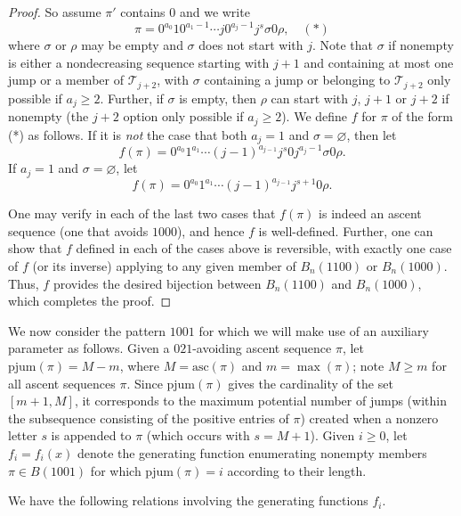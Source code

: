 \documentclass{article}
\theoremstyle{remark}
\theoremstyle{plain}
\begin{document}
\begin{proof}
So assume $\pi'$ contains 0 and we write $$\pi=0^{a_0}10^{a_1-1}\cdots j0^{a_j-1}j^s\sigma0\rho, \quad(*)$$ where $\sigma$ or $\rho$ may be empty and $\sigma$ does not start with $j$.  Note that $\sigma$ if nonempty is either a nondecreasing sequence starting with $j+1$ and containing at most one jump or a member of $\mathcal{T}_{j+2}$,  with $\sigma$ containing a jump or belonging to $\mathcal{T}_{j+2}$ only possible if $a_j\geq 2$.  Further, if $\sigma$ is empty, then $\rho$ can start with $j$, $j+1$ or $j+2$ if nonempty (the $j+2$ option only possible if $a_j \geq 2$).  We define $f$ for $\pi$ of the form (*) as follows.  If it is \emph{not} the case that both $a_j=1$ and $\sigma=\varnothing$,
then let
$$f(\pi)=0^{a_0}1^{a_1}\cdots(j-1)^{a_{j-1}}j^s0j^{a_j-1}\sigma0\rho.$$
If $a_j=1$ and $\sigma=\varnothing$, let
$$f(\pi)=0^{a_0}1^{a_1}\cdots(j-1)^{a_{j-1}}j^{s+1}0\rho.$$

One may verify in each of the last two cases that $f(\pi)$ is indeed an ascent sequence (one that avoids $1000$), and hence $f$ is well-defined.  Further, one can show that $f$ defined in each of the cases above is reversible, with exactly one case of $f$ (or its inverse) applying to any given member of $B_n(1100)$ or $B_n(1000)$.  Thus, $f$ provides the desired bijection between $B_n(1100)$ and $B_n(1000)$, which completes the proof.
\end{proof}

We now consider the pattern $1001$ for which we will make use of an auxiliary parameter as follows.  Given a $021$-avoiding ascent sequence $\pi$, let $\text{pjum}(\pi)=M-m$, where $M=\text{asc}(\pi)$ and $m=\max(\pi)$; note $M \geq m$ for all ascent sequences $\pi$.  Since $\text{pjum}(\pi)$ gives the cardinality of the set $[m+1,M]$, it corresponds to the maximum potential number of jumps (within the subsequence consisting of the positive entries of $\pi$) created when a nonzero letter $s$ is appended to $\pi$ (which occurs with $s=M+1$).  Given $i \geq0$, let $f_i=f_i(x)$ denote the generating function enumerating nonempty members $\pi \in B(1001)$ for which $\text{pjum}(\pi)=i$ according to their length.

We have the following relations involving the generating functions $f_i$.
\end{document}
